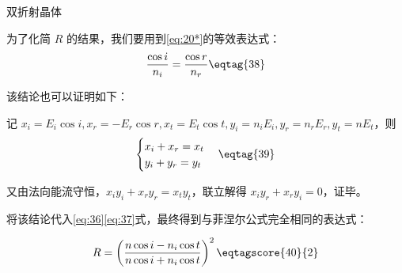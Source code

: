 \documentclass[answer]{cphos}
\begin{document}
\begin{problem}[50]{双折射晶体}
\begin{solution}
为了化简 $R$ 的结果，我们要用到\ref{eq:20*}的等效表达式：
\begin{equation}
    \dfrac{\cos i}{n_i}=\dfrac{\cos r}{n_r}\eqtag{38}
\end{equation}

该结论也可以证明如下：

记 $x_i=E_i\cos i,x_r=-E_r\cos r,x_t=E_t\cos t,y_i=n_iE_i,y_r=n_rE_r,y_t=nE_t$，则
\begin{equation}
    \begin{cases}
        x_i+x_r=x_t\\
        y_i+y_r=y_t
    \end{cases}\eqtag{39}
\end{equation}

又由法向能流守恒，$x_iy_i+x_ry_r=x_ty_t$，联立解得 $x_iy_r+x_ry_i=0$，证毕。

将该结论代入\ref{eq:36}\ref{eq:37}式，最终得到与菲涅尔公式完全相同的表达式：

\begin{equation}
    R=\left(\dfrac{n\cos i-n_i\cos t}{n\cos i+n_i\cos t}\right)^2\eqtagscore{40}{2}
\end{equation}

\scoring

\end{solution}

\end{problem}
\end{document}
